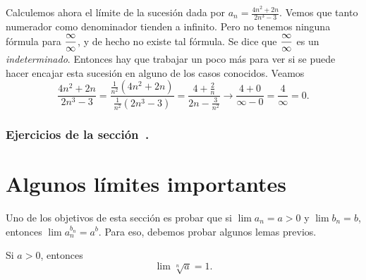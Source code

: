 \begin{example}
Calculemos ahora el límite de la sucesión dada por $a_n=\frac{4n^2+2n}{2n^3-3}$.
Vemos que tanto numerador como denominador tienden a infinito. Pero no tenemos ninguna fórmula para $\displaystyle\frac\infty\infty$, y de hecho no existe tal fórmula. Se dice que $\displaystyle\frac\infty\infty$ es un \emph{indeterminado}. Entonces hay que trabajar un poco más para ver si se puede hacer encajar esta sucesión en alguno de los casos conocidos. Veamos
\[
\frac{4n^2+2n}{2n^3-3}
= \frac{\frac1{n^2}(4n^2+2n)}{\frac1{n^2}(2n^3-3)}
= \frac{4 + \frac2n}{2n - \frac{3}{n^2}}
\to \frac{4 + 0}{\infty - 0} = \frac4\infty = 0.
\]
\end{example}


\subsubsection*{Ejercicios de la sección~.}

\begin{enumerate}

\end{enumerate}

\section{Algunos límites importantes}

Uno de los objetivos de esta sección es probar que si $\lim a_n = a>0$ y $\lim b_n = b$, entonces $\lim a_n^{b_n} = a^b$. Para eso, debemos probar algunos lemas previos.

\begin{lemma}
    Si $a>0$, entonces 
    \[ \lim \sqrt[n]a = 1. \]
\end{lemma}


